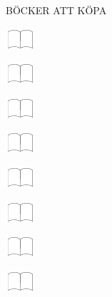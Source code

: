 \documentclass[11pt,titlepage]{article}
\begin{document}
\small
\hfill BÖCKER ATT KÖPA

\vspace{6mm}

\noindent
\includegraphics[]{book.pdf}

\vspace{12mm}

\noindent
\includegraphics[]{book.pdf}

\vspace{12mm}

\noindent
\includegraphics[]{book.pdf}

\vspace{12mm}

\noindent
\includegraphics[]{book.pdf}

\vspace{12mm}

\noindent
\includegraphics[]{book.pdf}

\vspace{12mm}

\noindent
\includegraphics[]{book.pdf}

\vspace{12mm}

\noindent
\includegraphics[]{book.pdf}

\vspace{12mm}

\noindent
\includegraphics[]{book.pdf}
\end{document}
